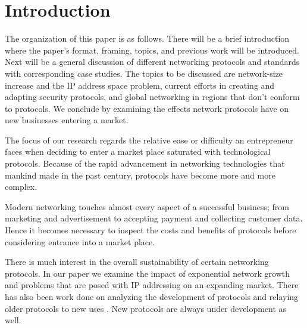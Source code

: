 \section{Introduction}

%
%


The organization of this paper is as follows. There will be a brief 
introduction where the paper's format, framing, topics, and previous work will
be introduced. Next will be a general discussion of different networking protocols and standards with corresponding
case studies. The topics to be discussed are network-size increase and the IP address space problem, current efforts in creating and adapting security protocols, and global networking in regions that don't
conform to protocols. We conclude by examining
the effects network protocols have on new businesses entering a market.


The focus of our research regards the relative ease or difficulty 
an entrepreneur faces when deciding to enter a market place saturated with technological protocols. 
Because of the rapid advancement in networking technologies that mankind made in the past
century, protocols have become more and more complex. 


Modern networking touches almost every aspect of a successful business; from 
marketing and advertisement to accepting payment and collecting customer data.
Hence it becomes necessary to inspect the costs and benefits of  
protocols before considering entrance into a market place. 


There is much interest in the overall sustainability of certain networking protocols\cite{4124025}. 
In our paper we examine the impact of exponential network growth and problems that are posed with 
IP addressing on an expanding market. There has also been work done on analyzing the development of protocols
\cite{4375858} and relaying older protocols to new uses
\cite{6296937}.  New protocols are always under development as well\cite{5977081}. 



